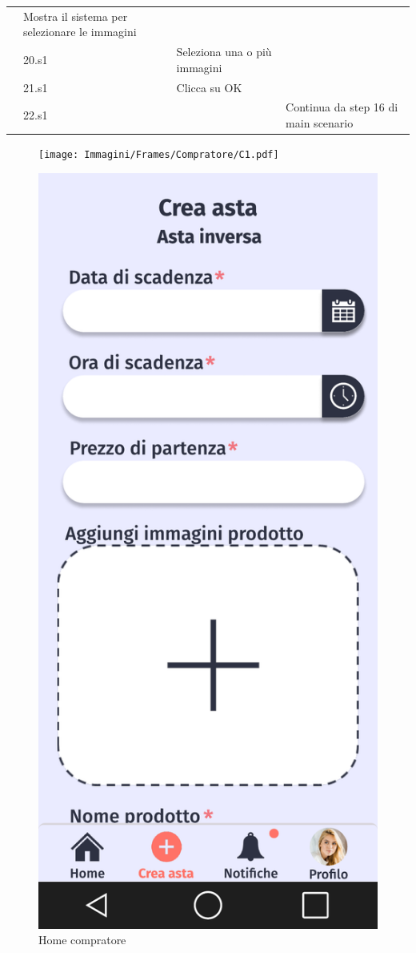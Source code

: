 \begin{longtable}{|C{3.0cm}|C{1.3cm}|L{5.2cm}|L{5.2cm}|}
                        & Mostra il sistema per selezionare le immagini\\
                        & 20.s1
                        & Seleziona una o più immagini
                        & \\
                        & 21.s1
                        & Clicca su OK
                        & \\
                        & 22.s1
                        & 
                        & Continua da step 16 di main scenario\\
                \hline
            \end{longtable}

            \begin{figure}[!htb]
            \begin{minipage}{0.32\textwidth}
                \centering
                \texttt{[image: Immagini/Frames/Compratore/C1.pdf]}
                \caption{Home compratore}
            \end{minipage}\hfill
            \begin{minipage}{0.32\textwidth}
                \centering
                \includegraphics[width=.7\linewidth]{Immagini/Frames/Compratore/C4.pdf}

\end{minipage}
\end{figure}
